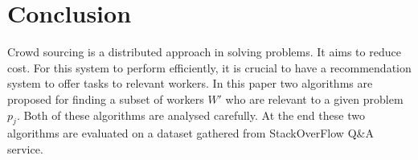 \documentclass{template}
\begin{document}
\section{Conclusion}
\label{sec:conclusion}
Crowd sourcing is a distributed approach in solving problems. It aims to reduce cost.
For this system to perform efficiently, it is crucial to have a recommendation system
to offer tasks to relevant workers.
In this paper two algorithms are proposed for finding a subset of workers \(W'\) who
are relevant to a given problem \(p_j\). Both of these algorithms are analysed carefully.
At the end these two algorithms are evaluated on a dataset gathered from StackOverFlow 
Q\&A service.
\end{document}
